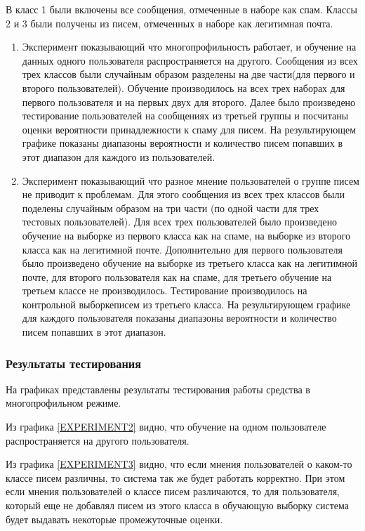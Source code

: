 В класс 1 были включены все сообщения, отмеченные в наборе \cite{SAPC} как спам. Классы 2 и 3 были получены из писем, отмеченных в наборе \cite{SAPC} как легитимная почта.
\begin{enumerate}
	\item Эксперимент показывающий что многопрофильность работает, и обучение на данных одного пользователя распространяется на другого. Сообщения из всех трех классов были случайным образом разделены на две части(для первого и второго пользователей). Обучение производилось на всех трех наборах для первого пользователя и на первых двух для второго. Далее было произведено тестирование пользователей на сообщениях из третьей группы и посчитаны оценки вероятности принадлежности к спаму для писем. На результирующем графике показаны диапазоны вероятности и количество писем попавших в этот диапазон для каждого из пользователей.

	\item Эксперимент показывающий что разное мнение пользователей о группе писем не приводит к проблемам. Для этого сообщения из всех трех классов были поделены случайным образом на три части (по одной части для трех тестовых пользователей). Для всех трех пользователей было произведено обучение на выборке из первого класса как на спаме, на выборке из второго класса как на легитимной почте. Дополнительно для первого пользователя было произведено обучение на выборке из третьего класса как на легитимной почте, для второго пользователя как на спаме, для третьего обучение на третьем классе не производилось. Тестирование производилось на контрольной выборкеписем из третьего класса. На результирующем графике для каждого пользователя показаны диапазоны вероятности и количество писем попавших в этот диапазон.
	
\end{enumerate}
\subsubsection{Результаты тестирования}
На графиках представлены результаты тестирования работы средства в многопрофильном режиме. 

Из графика \ref{EXPERIMENT2} видно, что обучение на одном пользователе распространяется на другого пользователя.

Из графика \ref{EXPERIMENT3} видно, что если мнения пользователей о каком-то классе писем различны, то система так же будет работать корректно. При этом если мнения пользователей о классе писем различаются, то для пользователя, который еще не добавлял писем из этого класса в обучающую выборку система будет выдавать некоторые промежуточные оценки.


